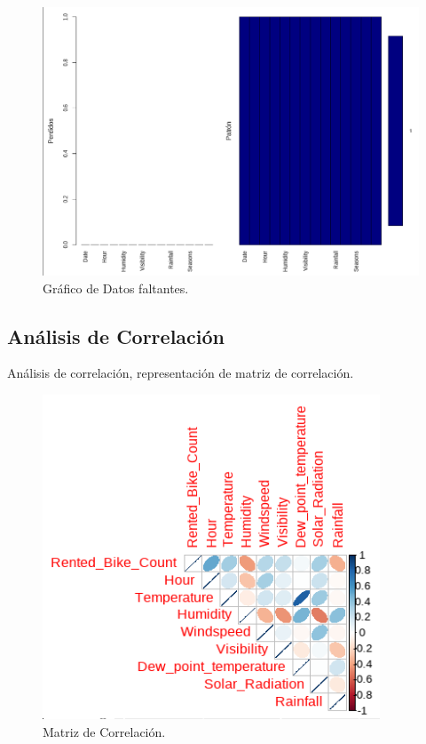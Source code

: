 \documentclass[]{elsarticle} %
\begin{document}
\begin{figure}[H]

{\centering \includegraphics[width=1\linewidth]{missing_data} 

}

\caption{\label{fig:fig7}Gráfico de Datos faltantes.}\label{fig:fig7}
\end{figure}
\newpage
\subsection{Análisis de Correlación}

Análisis de correlación, representación de matriz de correlación.

\begin{figure}[H]

{\centering \includegraphics[width=1\linewidth]{corr} 

}

\caption{\label{fig:fig8}Matriz de Correlación.}\label{fig:fig8}
\end{figure}
\end{document}
